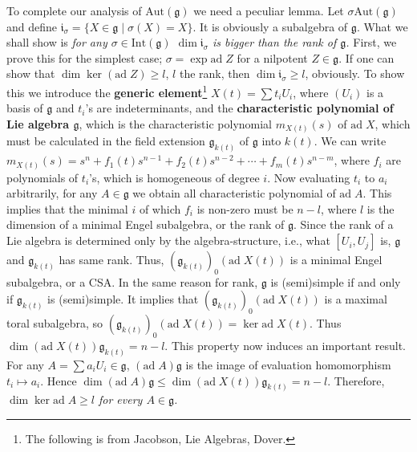 \documentclass{article}
\newcommand{\SBar}{\;|\;}
\newcommand{\lie}[1]{\mathfrak{#1}}
\newcommand{\ad}[1]{\mathrm{ad}\; #1}
\begin{document}
To complete our analysis of $\textrm{Aut}(\lie{g})$ we need a peculiar lemma.
Let $\sigma \textrm{Aut}(\lie{g})$ and define $\lie{i}_\sigma = \{X \in \lie{g} \SBar \sigma(X) = X\}$.
It is obviously a subalgebra of $\lie{g}$.
What we shall show is \textit{for any $\sigma \in \textrm{Int}(\lie{g})$ $\dim{\lie{i}_\sigma}$ is bigger than the rank of $\lie{g}$.}
First, we prove this for the simplest case; $\sigma = \exp{\ad{Z}}$ for a nilpotent $Z \in \lie{g}$.
If one can show that $\dim{\ker{(\ad{Z})}} \ge l$, $l$ the rank, then $\dim{\lie{i}_\sigma} \ge l$, obviously.
To show this we introduce the \textbf{generic element}\footnote{The following is from Jacobson, Lie Algebras, Dover.} $X(t) = \sum t_i U_i$, where $(U_i)$ is a basis of $\lie{g}$ and $t_i$'s are indeterminants, and the \textbf{characteristic polynomial of Lie algebra $\lie{g}$}, which is the characteristic polynomial $m_{X(t)}(s)$ of $\ad{X}$, which must be calculated in the field extension $\lie{g}_{k(t)}$ of $\lie{g}$ into $k(t)$.
We can write $m_{X(t)}(s) = s^n + f_1(t) s^{n - 1} + f_2(t) s^{n - 2} + \cdots + f_m(t) s^{n - m}$, where $f_i$ are polynomials of $t_i$'s, which is homogeneous of degree $i$.
Now evaluating $t_i$ to $a_i$ arbitrarily, for any $A \in \lie{g}$ we obtain all characteristic polynomial of $\ad{A}$.
This implies that the minimal $i$ of which $f_i$ is non-zero must be $n - l$, where $l$ is the dimension of a minimal Engel subalgebra, or the rank of $\lie{g}$.
Since the rank of a Lie algebra is determined only by the algebra-structure, i.e., what $[U_i, U_j]$ is, $\lie{g}$ and $\lie{g}_{k(t)}$ has same rank.
Thus, $(\lie{g}_{k(t)})_0(\ad{X(t)})$ is a minimal Engel subalgebra, or a CSA.
In the same reason for rank, $\lie{g}$ is (semi)simple if and only if $\lie{g}_{k(t)}$ is (semi)simple.
It implies that $(\lie{g}_{k(t)})_0(\ad{X(t)})$ is a maximal toral subalgebra, so $(\lie{g}_{k(t)})_0(\ad{X(t)}) = \ker{\ad{X(t)}}$.
Thus $\dim{(\ad{X(t)}) \lie{g}_{k(t)}} = n - l$.
This property now induces an important result.
For any $A = \sum a_i U_i \in \lie{g}$, $(\ad{A}) \lie{g}$ is the image of evaluation homomorphism $t_i \mapsto a_i$.
Hence $\dim{(\ad{A}) \lie{g}} \le \dim{(\ad{X(t)}) \lie{g}_{k(t)}} = n - l$.
Therefore, \textit{$\dim{\ker{\ad{A}}} \ge l$ for every $A \in \lie{g}$.}
\end{document}
